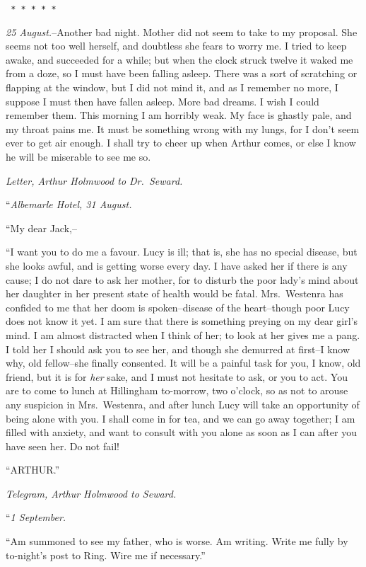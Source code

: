 \documentclass[12pt,openright]{book}
\begin{document}
\texttt{   *       *       *       *       *}

\textit{25 August.}–Another bad night. Mother did not seem to take to my proposal. She seems not too well herself, and doubtless she fears to worry me. I tried to keep awake, and succeeded for a while; but when the clock struck twelve it waked me from a doze, so I must have been falling asleep. There was a sort of scratching or flapping at the window, but I did not mind it, and as I remember no more, I suppose I must then have fallen asleep. More bad dreams. I wish I could remember them. This morning I am horribly weak. My face is ghastly pale, and my throat pains me. It must be something wrong with my lungs, for I don’t seem ever to get air enough. I shall try to cheer up when Arthur comes, or else I know he will be miserable to see me so.

\textit{Letter, Arthur Holmwood to Dr. Seward.}

“\textit{Albemarle Hotel, 31 August.}

“My dear Jack,–

“I want you to do me a favour. Lucy is ill; that is, she has no special disease, but she looks awful, and is getting worse every day. I have asked her if there is any cause; I do not dare to ask her mother, for to disturb the poor lady’s mind about her daughter in her present state of health would be fatal. Mrs. Westenra has confided to me that her doom is spoken–disease of the heart–though poor Lucy does not know it yet. I am sure that there is something preying on my dear girl’s mind. I am almost distracted when I think of her; to look at her gives me a pang. I told her I should ask you to see her, and though she demurred at first–I know why, old fellow–she finally consented. It will be a painful task for you, I know, old friend, but it is for \textit{her} sake, and I must not hesitate to ask, or you to act. You are to come to lunch at Hillingham to-morrow, two o’clock, so as not to arouse any suspicion in Mrs. Westenra, and after lunch Lucy will take an opportunity of being alone with you. I shall come in for tea, and we can go away together; I am filled with anxiety, and want to consult with you alone as soon as I can after you have seen her. Do not fail!

“ARTHUR.”

\textit{Telegram, Arthur Holmwood to Seward.}

“\textit{1 September.}

“Am summoned to see my father, who is worse. Am writing. Write me fully by to-night’s post to Ring. Wire me if necessary.”
\end{document}
